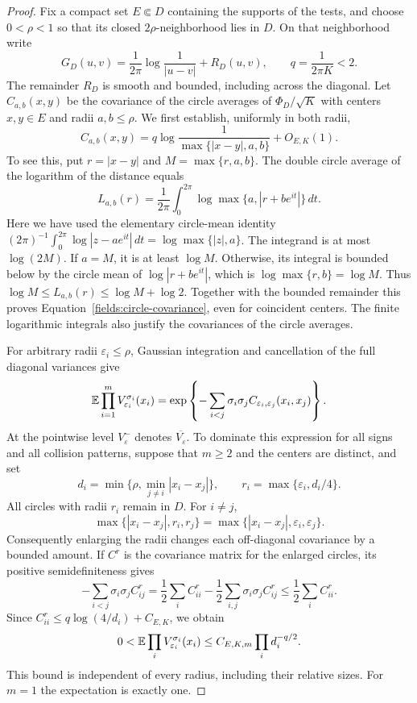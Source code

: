 \begin{proof}
Fix a compact set $E\Subset D$ containing the supports of the tests,
and choose $0<\rho<1$ so that its closed $2\rho$-neighborhood lies
in $D$.  On that neighborhood write
\[
 G_D(u,v)=\frac1{2\pi}\log\frac1{|u-v|}+R_D(u,v),
 \qquad q=\frac1{2\pi K}<2.
\]
The remainder $R_D$ is smooth and bounded, including across the
diagonal.  Let $C_{a,b}(x,y)$ be the covariance of the circle
averages of $\Phi_D/\sqrt K$ with centers $x,y\in E$ and radii
$a,b\leq\rho$.  We first establish, uniformly in both radii,
\begin{equation}\label{fields:circle-covariance}
 C_{a,b}(x,y)
   =q\log\frac1{\max\{|x-y|,a,b\}}+O_{E,K}(1).
\end{equation}
To see this, put $r=|x-y|$ and $M=\max\{r,a,b\}$.  The double
circle average of the logarithm of the distance equals
\[
 L_{a,b}(r)=\frac1{2\pi}\int_0^{2\pi}
                 \log\max\{a,|r+be^{it}|\}\,dt.
\]
Here we have used the elementary circle-mean identity
$(2\pi)^{-1}\int_0^{2\pi}\log|z-ae^{it}|\,dt
=\log\max\{|z|,a\}$.
The integrand is at most $\log(2M)$.  If $a=M$, it is at least
$\log M$.  Otherwise, its integral is bounded below by the circle
mean of $\log|r+be^{it}|$, which is $\log\max\{r,b\}=\log M$.
Thus $\log M\leq L_{a,b}(r)\leq\log M+\log2$.
Together with the bounded remainder this proves
Equation~\eqref{fields:circle-covariance}, even for coincident centers.
The finite logarithmic integrals also justify the covariances of
the circle averages.

For arbitrary radii $\varepsilon_i\leq\rho$, Gaussian integration
and cancellation of the full diagonal variances give
\begin{equation}\label{fields:regularized-kernel}
 \mathbb E\prod_{i=1}^m V_{\varepsilon_i}^{\sigma_i}(x_i)
   =\exp\left\{-\sum_{i<j}\sigma_i\sigma_j
                  C_{\varepsilon_i,\varepsilon_j}(x_i,x_j)\right\}.
\end{equation}
At the pointwise level $V_\varepsilon^-$ denotes
$\overline{V_\varepsilon}$.  To dominate this expression for all
signs and all collision patterns, suppose that $m\geq2$ and the
centers are distinct, and set
\[
 d_i=\min\{\rho,\min_{j\ne i}|x_i-x_j|\},
 \qquad r_i=\max\{\varepsilon_i,d_i/4\}.
\]
All circles with radii $r_i$ remain in $D$.  For $i\ne j$,
\[
 \max\{|x_i-x_j|,r_i,r_j\}
   =\max\{|x_i-x_j|,\varepsilon_i,\varepsilon_j\}.
\]
Consequently enlarging the radii changes each off-diagonal
covariance by a bounded amount.  If $C^r$ is the covariance matrix
for the enlarged circles, its positive semidefiniteness gives
\[
 -\sum_{i<j}\sigma_i\sigma_j C^r_{ij}
   =\frac12\sum_i C^r_{ii}
       -\frac12\sum_{i,j}\sigma_i\sigma_j C^r_{ij}
   \leq\frac12\sum_i C^r_{ii}.
\]
Since $C^r_{ii}\leq q\log(4/d_i)+C_{E,K}$, we obtain
\begin{equation}\label{fields:continuum-domination}
 0<\mathbb E\prod_i V_{\varepsilon_i}^{\sigma_i}(x_i)
     \leq C_{E,K,m}\prod_i d_i^{-q/2}.
\end{equation}
This bound is independent of every radius, including their
relative sizes.  For $m=1$ the expectation is exactly one.


\end{proof}
